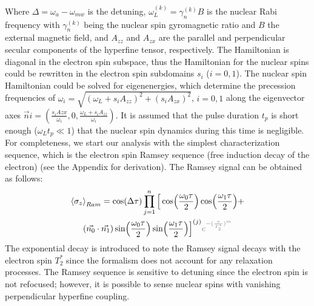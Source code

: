 \documentclass[%
 reprint,
superscriptaddress,
 amsmath,amssymb,
 aps,
]{revtex4-2}
\begin{document}
Where $\Delta = \omega_a - \omega_{mw}$ is the detuning, $\omega_L^{(k)} =\gamma_n^{(k)} B$ is the nuclear Rabi frequency with $\gamma_n^{(k)}$ being the nuclear spin gyromagnetic ratio and $B$ the external magnetic field, and $A_{zz}$ and $A_{zx}$ are the parallel and perpendicular secular components of the hyperfine tensor, respectively.
The Hamiltonian is diagonal in the electron spin subspace, thus the Hamiltonian for the nuclear spins could be rewritten in the electron spin subdomains $s_i$ ($i=0,1$).
The nuclear spin Hamiltonian could be solved for eigenenergies, which determine the precession frequencies of $\omega_i = \sqrt{(\omega_L + s_i A_{zz})^2+ (s_i A_{zx})^2}$, $i=0,1$ along the eigenvector axes $\vec{n}i =(\frac{s_i A{zx}}{\omega_i}, 0, \frac{\omega_L + s_i A_{zz}} {\omega_i})$.
It is assumed that the pulse duration $t_p$ is short enough ($\omega_L t_p \ll 1$) that the nuclear spin dynamics during this time is negligible.
For completeness, we start our analysis with the simplest characterization sequence, which is the electron spin Ramsey sequence (free induction decay of the electron) (see the Appendix for derivation).
The Ramsey signal can be obtained as follows:
\begin{gather}
	\expval{\sigma_z}_{Ram} = \cos(\Delta \tau) \prod_{j=1}^{n} \Big[ \cos(\frac{\omega_0 \tau}{2}) \cos(\frac{\omega_1 \tau}{2})+ \notag \\
	(\vec{n_0}\cdot \vec{n_1})\sin(\frac{\omega_0 \tau}{2}) \sin(\frac{\omega_1 \tau}{2}) \Big]^{(j)}
	\textcolor{gray}{e^{-(\frac{\tau}{T_2^\ast})^m}}
\end{gather}	
The exponential decay is introduced to note the Ramsey signal decays with the electron spin $T_2^\ast$ since the formalism does not account for any relaxation processes. The Ramsey sequence is sensitive to detuning since the electron spin is not refocused; however, it is possible to sense nuclear spins with vanishing perpendicular hyperfine coupling.\\
\end{document}
